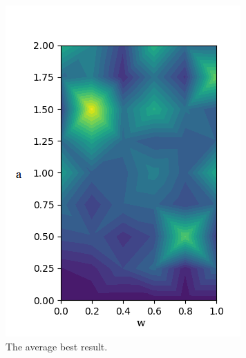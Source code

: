 \documentclass[]{article}
\begin{document}
\begin{figure}[h]
    \centering
    \begin{subfigure}[b]{0.4\textwidth}
        \centering
        \includegraphics[width=\textwidth]{images/200_avg_results_best.png}
        \caption{The average best result.}
        \label{fig:average best}
    \end{subfigure}
    \qquad
    \begin{subfigure}[b]{0.4\textwidth}
        \centering

\end{subfigure}
\end{figure}
\end{document}

